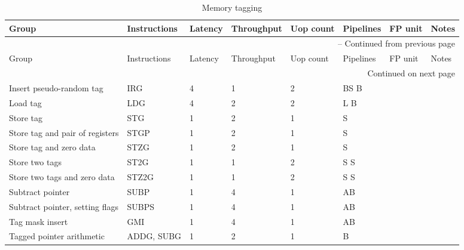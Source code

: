 \newpage
\begin{longtable}{|p{1in}|p{1in}|l|l|l|p{1in}|l|p{1in}|}
\caption{Memory tagging} \\
\hline
Group & Instructions & Latency & Throughput & Uop count & Pipelines & FP unit & Notes\\
\hline
\endfirsthead
\hline
\multicolumn{8}{|r|}{{\tablename\ \thetable{} -- Continued from previous page}} \\
\hline
Group & Instructions & Latency & Throughput & Uop count & Pipelines & FP unit & Notes\\
\hline
\endhead
\hline
\multicolumn{8}{|r|}{{Continued on next page}} \\
\hline
\endfoot
\hline
\endlastfoot
Insert pseudo-random tag & IRG & 4 & 1 & 2 & BS B &  & \\
\hline
Load tag & LDG & 4 & 2 & 2 & L B &  & \\
\hline
Store tag & STG & 1 & 2 & 1 & S &  & \\
\hline
Store tag and pair of registers & STGP & 1 & 2 & 1 & S &  & \\
\hline
Store tag and zero data & STZG & 1 & 2 & 1 & S &  & \\
\hline
Store two tags & ST2G & 1 & 1 & 2 & S S &  & \\
\hline
Store two tags and zero data & STZ2G & 1 & 1 & 2 & S S &  & \\
\hline
Subtract pointer & SUBP & 1 & 4 & 1 & AB &  & \\
\hline
Subtract pointer, setting flags & SUBPS & 1 & 4 & 1 & AB &  & \\
\hline
Tag mask insert & GMI & 1 & 4 & 1 & AB &  & \\
\hline
Tagged pointer arithmetic & ADDG, SUBG & 1 & 2 & 1 & B &  & \\
\hline
\end{longtable}
\newpage
